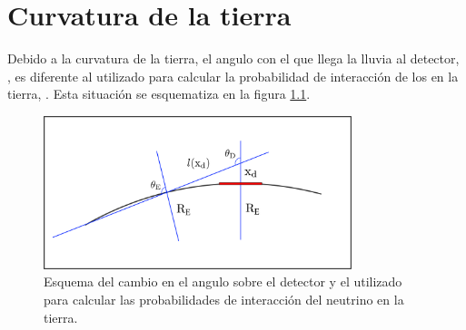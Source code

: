 \chapter{Curvatura de la tierra}
\label{ap:tierraCurva}

	
	Debido a la curvatura de la tierra, el angulo con el que llega la lluvia al detector, \td{}, es diferente al utilizado para calcular la probabilidad de interacci\'on de los \nutau{} en la tierra, \te{}.
	Esta situaci\'on se esquematiza en la figura \ref{fig:curveEarthSketch}.
	
	\begin{figure}[ht!]
		\centering
		\includegraphics[width=0.8\textwidth]{./fig/appendix/curveEarthSketch.pdf}
		\caption{\label{fig:curveEarthSketch}
		Esquema del cambio en el angulo sobre el detector y el utilizado para calcular las probabilidades de interacci\'on del neutrino en la tierra.
		}
	\end{figure}
	
